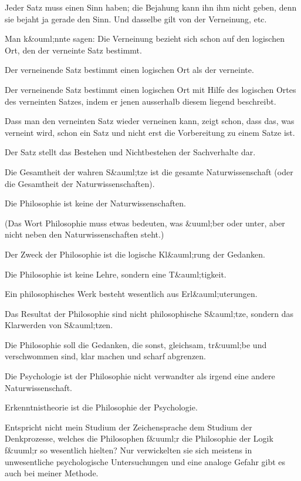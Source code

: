 {Jeder Satz muss  einen Sinn haben;
die Bejahung kann ihn ihm nicht geben, denn
sie bejaht ja gerade den Sinn. Und dasselbe gilt
von der Verneinung, etc.}


{Man k&ouml;nnte sagen: Die Verneinung bezieht
sich schon auf den logischen Ort, den der verneinte
Satz bestimmt.

Der verneinende Satz bestimmt einen 
logischen Ort als der verneinte.

Der verneinende Satz bestimmt einen logischen
Ort mit Hilfe des logischen Ortes des verneinten
Satzes, indem er jenen ausserhalb diesem liegend
beschreibt.

Dass man den verneinten Satz wieder verneinen
kann, zeigt schon, dass das, was verneint wird,
schon ein Satz und nicht erst die Vorbereitung
zu einem Satze ist.}


{Der Satz stellt das Bestehen und Nichtbestehen
der Sachverhalte dar.}


{Die Gesamtheit der wahren S&auml;tze ist die
gesamte Naturwissenschaft (oder die Gesamtheit
der Naturwissenschaften).}


{Die Philosophie ist keine der Naturwissenschaften.

(Das Wort \glqq{}Philosophie\grqq{} muss etwas bedeuten,
was &uuml;ber oder unter, aber nicht neben den Naturwissenschaften
steht.)}


{Der Zweck der Philosophie ist die logische
Kl&auml;rung der Gedanken.

Die Philosophie ist keine Lehre, sondern eine
T&auml;tigkeit.

Ein philosophisches Werk besteht wesentlich
aus Erl&auml;uterungen.

Das Resultat der Philosophie sind nicht \glqq{}philosophische
S&auml;tze\grqq{}, sondern das Klarwerden von
S&auml;tzen.

Die Philosophie soll die Gedanken, die sonst,
gleichsam, tr&uuml;be und verschwommen sind, klar
machen und scharf abgrenzen.}


{Die Psychologie ist der Philosophie nicht verwandter
als irgend eine andere Naturwissenschaft.

Erkenntnistheorie ist die Philosophie der
Psychologie.

Entspricht nicht mein Studium der Zeichensprache
dem Studium der Denkprozesse, welches
die Philosophen f&uuml;r die Philosophie der Logik f&uuml;r
so wesentlich hielten? Nur verwickelten sie sich
meistens in unwesentliche psychologische Untersuchungen
und eine analoge Gefahr gibt es auch
bei meiner Methode.}


